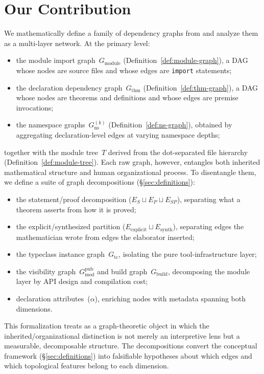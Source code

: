 \section{Our Contribution}
\label{sec:contribution}

We mathematically define a family of dependency graphs from  and analyze them as a multi-layer network. At the primary level:
\begin{itemize}
    \item the module import graph~$G_{\mathrm{module}}$ (Definition~\ref{def:module-graph}), a DAG whose nodes are source files and whose edges are \texttt{import} statements;
    \item the declaration dependency graph~$G_{\mathrm{thm}}$ (Definition~\ref{def:thm-graph}), a DAG whose nodes are theorems and definitions and whose edges are premise invocations;
    \item the namespace graphs~$G_{\mathrm{ns}}^{(k)}$ (Definition~\ref{def:ns-graph}), obtained by aggregating declaration-level edges at varying namespace depths;
\end{itemize}
together with the module tree~$T$ derived from the dot-separated file hierarchy (Definition~\ref{def:module-tree}). Each raw graph, however, entangles both inherited mathematical structure and human organizational process. To disentangle them, we define a suite of graph decompositions (\S\ref{sec:definitions}):
\begin{itemize}
    \item the statement/proof decomposition ($E_S \sqcup E_P \sqcup E_{SP}$), separating what a theorem asserts from how it is proved;
    \item the explicit/synthesized partition ($E_{\mathrm{explicit}} \sqcup E_{\mathrm{synth}}$), separating edges the mathematician wrote from edges the elaborator inserted;
    \item the typeclass instance graph~$G_{\mathrm{tc}}$, isolating the pure tool-infrastructure layer;
    \item the visibility graph~$G_{\mathrm{mod}}^{\mathrm{pub}}$ and build graph~$G_{\mathrm{build}}$, decomposing the module layer by API design and compilation cost;
    \item declaration attributes~($\alpha$), enriching nodes with metadata spanning both dimensions.
\end{itemize}
This formalization treats  as a graph-theoretic object in which the inherited/organizational distinction is not merely an interpretive lens but a measurable, decomposable structure. The decompositions convert the conceptual framework (\S\ref{sec:definitions}) into falsifiable hypotheses about which edges and which topological features belong to each dimension.


